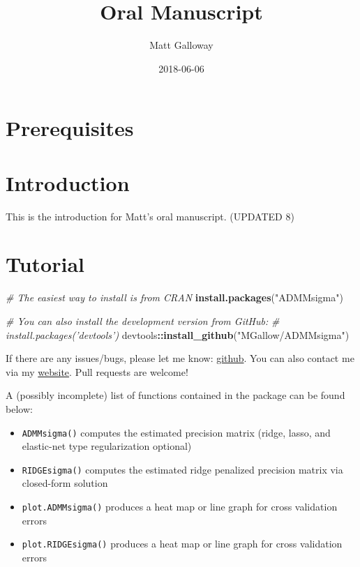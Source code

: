 \documentclass[12pt,]{book}
\title{Oral Manuscript}
\author{Matt Galloway}
\date{2018-06-06}
\newenvironment{Shaded}{\begin{snugshade}}{\end{snugshade}}
\newcommand{\CommentTok}[1]{\textcolor[rgb]{0.56,0.35,0.01}{\textit{#1}}}
\newcommand{\KeywordTok}[1]{\textcolor[rgb]{0.13,0.29,0.53}{\textbf{#1}}}
\newcommand{\NormalTok}[1]{#1}
\newcommand{\OperatorTok}[1]{\textcolor[rgb]{0.81,0.36,0.00}{\textbf{#1}}}
\newcommand{\StringTok}[1]{\textcolor[rgb]{0.31,0.60,0.02}{#1}}
\theoremstyle{definition}
\theoremstyle{definition}
\theoremstyle{definition}
\theoremstyle{remark}
\begin{document}
\maketitle

{
\hypersetup{linkcolor=}
\setcounter{tocdepth}{2}
\tableofcontents
}
\hypertarget{prerequisites}{%
\chapter{Prerequisites}\label{prerequisites}}

\hypertarget{intro}{%
\chapter{Introduction}\label{intro}}

This is the introduction for Matt's oral manuscript. (UPDATED 8)

\hypertarget{tutorial}{%
\chapter{Tutorial}\label{tutorial}}

\vspace{0.5cm}

\begin{Shaded}
\begin{Highlighting}[]
\CommentTok{# The easiest way to install is from CRAN}
\KeywordTok{install.packages}\NormalTok{(}\StringTok{"ADMMsigma"}\NormalTok{)}

\CommentTok{# You can also install the development version from GitHub:}
\CommentTok{# install.packages('devtools')}
\NormalTok{devtools}\OperatorTok{::}\KeywordTok{install_github}\NormalTok{(}\StringTok{"MGallow/ADMMsigma"}\NormalTok{)}
\end{Highlighting}
\end{Shaded}

\vspace{0.5cm}

If there are any issues/bugs, please let me know:
\href{https://github.com/MGallow/ADMMsigma/issues}{github}. You can also
contact me via my \href{https://mgallow.github.io/}{website}. Pull
requests are welcome!

\vspace{0.5cm}

A (possibly incomplete) list of functions contained in the package can
be found below:

\begin{itemize}
\item
  \texttt{ADMMsigma()} computes the estimated precision matrix (ridge,
  lasso, and elastic-net type regularization optional)
\item
  \texttt{RIDGEsigma()} computes the estimated ridge penalized precision
  matrix via closed-form solution
\item
  \texttt{plot.ADMMsigma()} produces a heat map or line graph for cross
  validation errors
\item
  \texttt{plot.RIDGEsigma()} produces a heat map or line graph for cross
  validation errors
\end{itemize}
\end{document}
